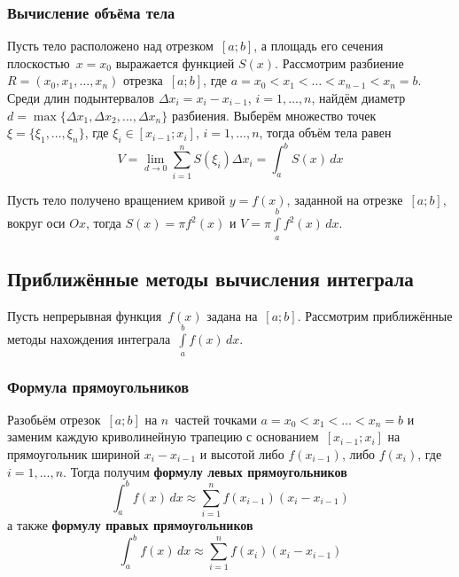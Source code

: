 \subsubsection{Вычисление объёма тела}
Пусть тело расположено над отрезком~$[a; b]$, а площадь его сечения плоскостью~$x = x_0$ выражается функцией $S(x)$.
Рассмотрим разбиение~$R = (x_0, x_1, \ldots, x_n)$ отрезка~$[a; b]$, где $a = x_0 < x_1 < \ldots < x_{n-1} < x_n = b$.
Среди длин подынтервалов $\Delta x_i = x_i - x_{i-1}$, $i = 1, \ldots, n$, найдём диаметр $d = \max \{ \Delta x_1, \Delta x_2, \ldots, \Delta x_n \}$ разбиения.
Выберём множество точек $\xi = \{ \xi_1, \ldots, \xi_n \}$, где $\xi_i \in [x_{i-1}; x_i]$, $i = 1, \ldots, n$, тогда объём тела равен
\begin{equation*}
V = \lim_{d \to 0} \sum_{i=1}^n S(\xi_i) \Delta x_i =
\int_a^b S(x)\,dx
\end{equation*}

Пусть тело получено вращением кривой $y = f(x)$, заданной на отрезке~$[a; b]$, вокруг оси $Ox$, тогда $S(x) = \pi f^2(x)$ и $V = \pi \int\limits_a^b f^2(x)\,dx$.

\subsection{Приближённые методы вычисления интеграла}
Пусть непрерывная функция~$f(x)$ задана на~$[a; b]$.
Рассмотрим приближённые методы нахождения интеграла~$\int\limits_a^b f(x)\,dx$.

\subsubsection{Формула прямоугольников}
 Разобьём отрезок~$[a; b]$ на $n$~частей точками $a = x_0 < x_1 < \ldots < x_n = b$ и заменим каждую криволинейную трапецию с основанием~$[x_{i-1}; x_i]$ на прямоугольник шириной $x_i - x_{i-1}$ и высотой либо $f(x_{i-1})$, либо $f(x_i)$, где $i = 1, \ldots, n$.
Тогда получим \textbf{формулу левых прямоугольников}
\begin{equation*}
\int_a^b f(x)\,dx \approx \sum_{i=1}^n f(x_{i-1}) (x_i - x_{i-1})
\end{equation*}
а также \textbf{формулу правых прямоугольников}
\begin{equation*}
\int_a^b f(x)\,dx \approx \sum_{i=1}^n f(x_i) (x_i - x_{i-1})
\end{equation*}

